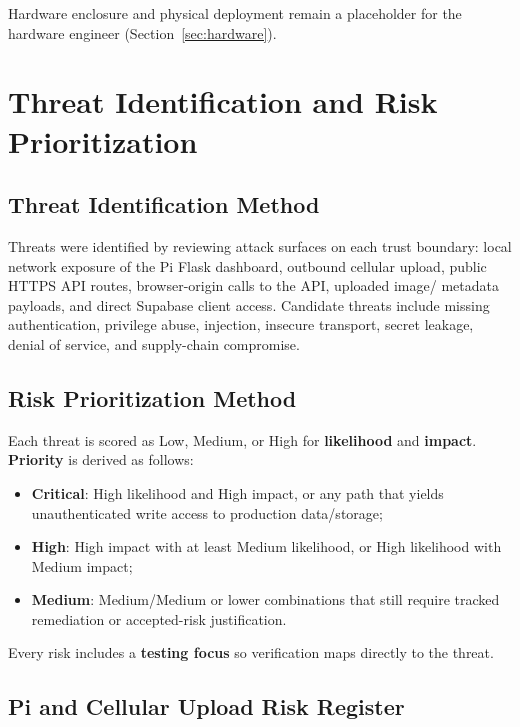 \documentclass[12pt]{article}
\begin{document}
Hardware enclosure and physical deployment remain a placeholder for the hardware
engineer (Section~\ref{sec:hardware}).

\section{Threat Identification and Risk Prioritization}
\label{sec:threats}

\subsection{Threat Identification Method}

Threats were identified by reviewing attack surfaces on each trust boundary:
local network exposure of the Pi Flask dashboard, outbound cellular upload,
public HTTPS API routes, browser-origin calls to the API, uploaded image/
metadata payloads, and direct Supabase client access. Candidate threats include
missing authentication, privilege abuse, injection, insecure transport, secret
leakage, denial of service, and supply-chain compromise.

\subsection{Risk Prioritization Method}

Each threat is scored as Low, Medium, or High for \textbf{likelihood} and
\textbf{impact}. \textbf{Priority} is derived as follows:

\begin{itemize}
    \item \textbf{Critical}: High likelihood and High impact, or any path that
          yields unauthenticated write access to production data/storage;
    \item \textbf{High}: High impact with at least Medium likelihood, or High
          likelihood with Medium impact;
    \item \textbf{Medium}: Medium/Medium or lower combinations that still require
          tracked remediation or accepted-risk justification.
\end{itemize}

Every risk includes a \textbf{testing focus} so verification maps directly to the
threat.

\subsection{Pi and Cellular Upload Risk Register}
\end{document}
